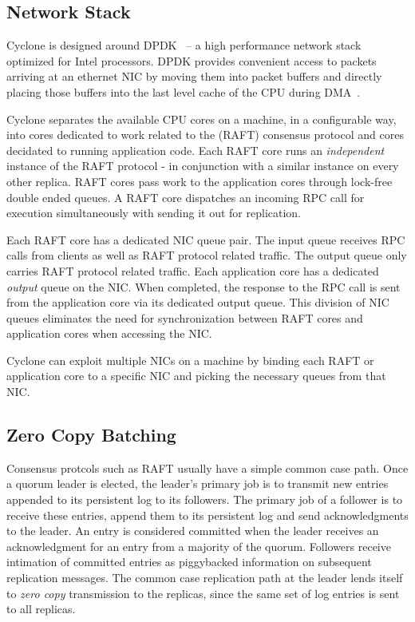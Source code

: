 \documentclass[letterpaper,twocolumn,10pt]{article}
\begin{document}
\subsection{Network Stack}
Cyclone is designed around DPDK~\cite{dpdk} -- a high performance network stack
optimized for Intel processors. DPDK provides convenient access to packets
arriving at an ethernet NIC by moving them into packet buffers and directly
placing those buffers into the last level cache of the CPU during DMA~\cite{ddio}.

Cyclone separates the available CPU cores on a machine, in a configurable way,
into cores dedicated to work related to the (RAFT) consensus protocol and cores
decidated to running application code. Each RAFT core runs an \emph{independent}
instance of the RAFT protocol - in conjunction with a similar instance on every
other replica. RAFT cores pass work to the application cores through lock-free
double ended queues. A RAFT core dispatches an incoming RPC call for execution
simultaneously with sending it out for replication.

Each RAFT core has a dedicated NIC queue pair. The input queue receives RPC
calls from clients as well as RAFT protocol related traffic. The output queue
only carries RAFT protocol related traffic. Each application core has a
dedicated \emph{output} queue on the NIC. When completed, the response to the
RPC call is sent from the application core via its dedicated output queue. This
division of NIC queues eliminates the need for synchronization between RAFT
cores and application cores when accessing the NIC.

Cyclone can exploit multiple NICs on a machine by binding each RAFT or
application core to a specific NIC and picking the necessary queues from that
NIC.

\subsection{Zero Copy Batching}
Consensus protcols such as RAFT usually have a simple common case path. Once a
quorum leader is elected, the leader's primary job is to transmit new entries
appended to its persistent log to its followers. The primary job of a follower
is to receive these entries, append them to its persistent log and send
acknowledgments to the leader. An entry is considered committed when the leader
receives an acknowledgment for an entry from a majority of the quorum. Followers
receive intimation of committed entries as piggybacked information on subsequent
replication messages. The common case replication path at the leader lends
itself to \emph{zero copy} transmission to the replicas, since the same set of
log entries is sent to all replicas.
\end{document}
